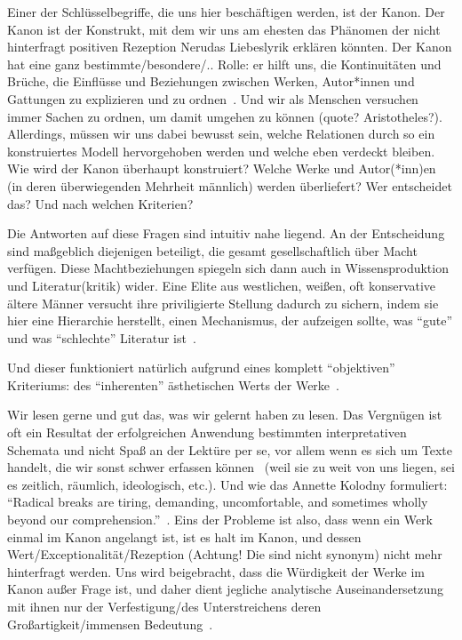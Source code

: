 Einer der Schlüsselbegriffe, die uns hier beschäftigen werden, ist der Kanon.
Der Kanon ist der Konstrukt, mit dem wir uns am ehesten das Phänomen der nicht hinterfragt positiven Rezeption Nerudas Liebeslyrik erklären könnten.
Der Kanon hat eine ganz bestimmte/besondere/.. Rolle: er hilft uns, die Kontinuitäten und Brüche, die Einflüsse und Beziehungen zwischen Werken, Autor*innen und Gattungen zu explizieren und zu ordnen~\cite{Kolodny1980}.
Und wir als Menschen versuchen immer Sachen zu ordnen, um damit umgehen zu können (quote? Aristotheles?). %
Allerdings, müssen wir uns dabei bewusst sein, welche Relationen durch so ein konstruiertes Modell hervorgehoben werden und welche eben verdeckt bleiben.
Wie wird der Kanon überhaupt konstruiert?
Welche Werke und Autor(*inn)en (in deren überwiegenden Mehrheit männlich) werden überliefert?
Wer entscheidet das?
Und nach welchen Kriterien?

Die Antworten auf diese Fragen sind intuitiv nahe liegend.
An der Entscheidung sind maßgeblich diejenigen beteiligt, die gesamt gesellschaftlich über Macht verfügen.
Diese Machtbeziehungen spiegeln sich dann auch in Wissensproduktion und Literatur(kritik) wider.
Eine Elite aus westlichen, weißen, oft konservative ältere Männer versucht ihre priviligierte Stellung dadurch zu sichern, indem sie hier eine Hierarchie herstellt, einen Mechanismus, der aufzeigen sollte, was ``gute'' und was ``schlechte'' Literatur ist~\cite{North2013}.%

Und dieser funktioniert natürlich aufgrund eines komplett ``objektiven'' Kriteriums: des ``inherenten'' ästhetischen Werts der Werke~\cite{North2013}.

Wir lesen gerne und gut das, was wir gelernt haben zu lesen.
Das Vergnügen ist oft ein Resultat der erfolgreichen Anwendung bestimmten interpretativen Schemata und nicht Spaß an der Lektüre per se, vor allem wenn es sich um Texte handelt, die wir sonst schwer erfassen können~\cite{Kolodny1980} (weil sie zu weit von uns liegen, sei es zeitlich, räumlich, ideologisch, etc.).
Und wie das Annette Kolodny formuliert:
``Radical breaks are tiring, demanding, uncomfortable, and sometimes wholly beyond our comprehension.''~\cite{Kolodny1980}.
Eins der Probleme ist also, dass wenn ein Werk einmal im Kanon angelangt ist, ist es halt im Kanon, und dessen Wert/Exceptionalität/Rezeption (Achtung! Die sind nicht synonym) nicht mehr hinterfragt werden.
Uns wird beigebracht, dass die Würdigkeit der Werke im Kanon außer Frage ist,
und daher dient jegliche analytische Auseinandersetzung mit ihnen nur der Verfestigung/des Unterstreichens deren Großartigkeit/immensen Bedeutung~\cite{Kolodny1980}.

